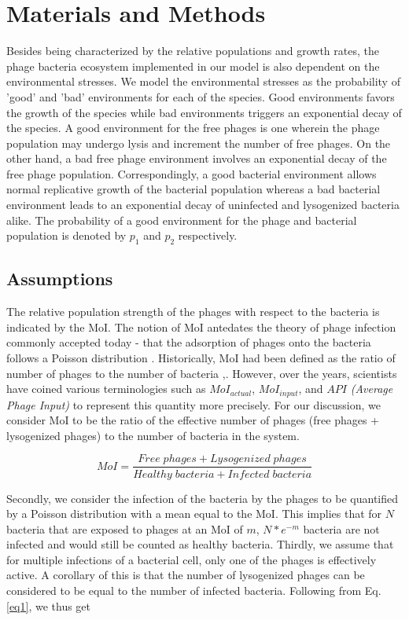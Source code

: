 \documentclass[12pt,letterpaper]{article}
\begin{document}
\newpage

\section*{Materials and Methods}

Besides being characterized by the relative populations and growth rates, the phage bacteria ecosystem implemented in our model is also dependent on the environmental stresses. We model the environmental stresses as the probability of 'good' and 'bad' environments for each of the species. Good environments favors the growth of the species while bad environments triggers an exponential decay of the species. A good environment for the free phages is one wherein the phage population may undergo lysis and increment the number of free phages. On the other hand, a bad free phage environment involves an exponential decay of the free phage population. Correspondingly, a good bacterial environment allows normal replicative growth of the bacterial population whereas a bad bacterial environment leads to an exponential decay of uninfected and lysogenized bacteria alike. The probability of a good environment for the phage and bacterial population is denoted by $p_1$ and $p_2$ respectively.

\subsection*{Assumptions}
The relative population strength of the phages with respect to the bacteria is indicated by the MoI. The notion of MoI antedates the theory of phage infection commonly accepted today - that the adsorption of phages onto the bacteria follows a Poisson distribution \cite{ellis1939growth}. Historically, MoI had been defined as the ratio of number of phages to the number of bacteria \cite{kasman2002overcoming},\cite{abedon2016phage}. However, over the years, scientists have coined various terminologies such as $MoI_{actual}$, $MoI_{input}$, and $API$ \textit{(Average Phage Input)} to represent this quantity more precisely. For our discussion, we consider MoI to be the ratio of the effective number of phages (free phages + lysogenized phages) to the number of bacteria in the system.

\begin{equation}
\label{eq1}
MoI = \frac{Free\;phages + Lysogenized\;phages}{Healthy\;bacteria + Infected\;bacteria}
\end{equation}

Secondly, we consider the infection of the bacteria by the phages to be quantified by a Poisson distribution with a mean equal to the MoI. This implies that for $N$ bacteria that are exposed to phages at an MoI of $m$, $N*e^{-m}$ bacteria are not infected and would still be counted as healthy bacteria. Thirdly, we assume that for multiple infections of a bacterial cell, only one of the phages is effectively active\cite{ellis1939growth}. A corollary of this is that the number of lysogenized phages can be considered to be equal to the number of infected bacteria. Following from Eq. \ref{eq1}, we thus get
\end{document}
